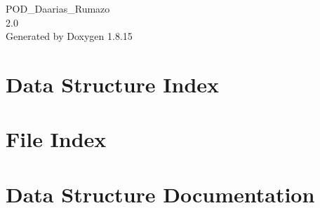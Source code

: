 \let\mypdfximage\pdfximage\def\pdfximage{\immediate\mypdfximage}\documentclass[twoside]{book}
\newcommand{\+}{\discretionary{\mbox{\scriptsize$\hookleftarrow$}}{}{}}
\newcommand{\clearemptydoublepage}{%
  \newpage{\pagestyle{empty}\cleardoublepage}%
}
\begin{document}
\hypersetup{pageanchor=false,
             bookmarksnumbered=true,
             pdfencoding=unicode
            }
\begin{titlepage}
\vspace*{7cm}
\begin{center}%
{\Large P\+O\+D\+\_\+\+Daarias\+\_\+\+Rumazo \\[1ex]\large 2.\+0 }\\
\vspace*{1cm}
{\large Generated by Doxygen 1.8.15}\\
\end{center}
\end{titlepage}
\clearemptydoublepage
{}
\tableofcontents
\clearemptydoublepage
{}
\hypersetup{pageanchor=true}

\chapter{Data Structure Index}

\chapter{File Index}

\chapter{Data Structure Documentation}

\end{document}
